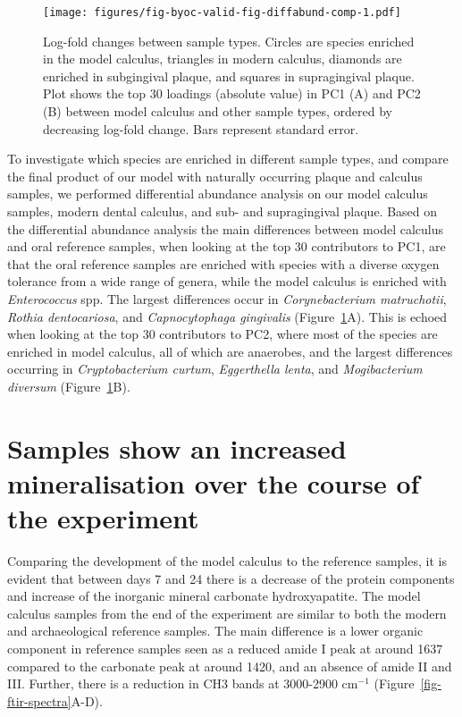 \documentclass[
  letterpaper,
]{book}
\begin{document}
\begin{figure}

{\centering \texttt{[image: figures/fig-byoc-valid-fig-diffabund-comp-1.pdf]}

}

\caption{\label{fig-diffabund-comp}Log-fold changes between sample
types. Circles are species enriched in the model calculus, triangles in
modern calculus, diamonds are enriched in subgingival plaque, and
squares in supragingival plaque. Plot shows the top 30 loadings
(absolute value) in PC1 (A) and PC2 (B) between model calculus and other
sample types, ordered by decreasing log-fold change. Bars represent
standard error.}

\end{figure}

To investigate which species are enriched in different sample types, and
compare the final product of our model with naturally occurring plaque
and calculus samples, we performed differential abundance analysis on
our model calculus samples, modern dental calculus, and sub- and
supragingival plaque. Based on the differential abundance analysis the
main differences between model calculus and oral reference samples, when
looking at the top 30 contributors to PC1, are that the oral reference
samples are enriched with species with a diverse oxygen tolerance from a
wide range of genera, while the model calculus is enriched with
\emph{Enterococcus} spp. The largest differences occur in
\emph{Corynebacterium matruchotii}, \emph{Rothia dentocariosa}, and
\emph{Capnocytophaga gingivalis} (Figure~\ref{fig-diffabund-comp}A).
This is echoed when looking at the top 30 contributors to PC2, where
most of the species are enriched in model calculus, all of which are
anaerobes, and the largest differences occurring in
\emph{Cryptobacterium curtum}, \emph{Eggerthella lenta}, and
\emph{Mogibacterium diversum} (Figure~\ref{fig-diffabund-comp}B).

\hypertarget{samples-show-an-increased-mineralisation-over-the-course-of-the-experiment}{%
\section{Samples show an increased mineralisation over the course of the
experiment}\label{samples-show-an-increased-mineralisation-over-the-course-of-the-experiment}}

Comparing the development of the model calculus to the reference
samples, it is evident that between days 7 and 24 there is a decrease of
the protein components and increase of the inorganic mineral carbonate
hydroxyapatite. The model calculus samples from the end of the
experiment are similar to both the modern and archaeological reference
samples. The main difference is a lower organic component in reference
samples seen as a reduced amide I peak at around 1637 compared to the
carbonate peak at around 1420, and an absence of amide II and III.
Further, there is a reduction in CH3 bands at 3000-2900 cm\(^{-1}\)
(Figure~\ref{fig-ftir-spectra}A-D).
\end{document}
